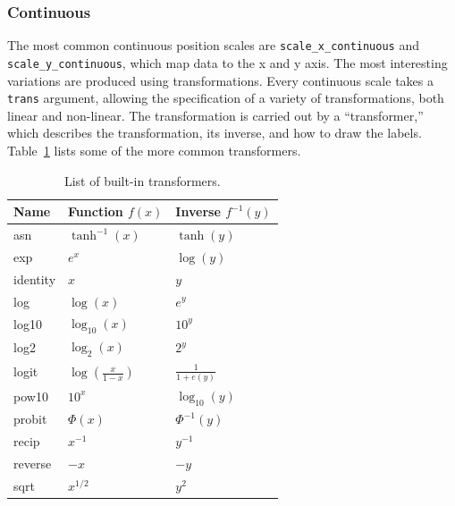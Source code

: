 \subsubsection{Continuous}
\label{sub:scale-continuous}

The most common continuous position scales are {\tt scale\_x\_continuous} and {\tt scale\_y\_continuous}, which map data to the x and y axis.  The most interesting variations are produced using transformations.  Every continuous scale takes a {\tt trans} argument, allowing the specification of a variety of transformations, both linear and non-linear.  The transformation is carried out by a ``transformer,'' which describes the transformation, its inverse, and how to draw the labels. Table~\ref{tbl:common-trans} lists some of the more common transformers.    

\begin{table}
  \centering
  \begin{tabular}{lll}
    \toprule
    Name & Function $f(x)$ & Inverse $f^{-1}(y)$ \\
    \midrule
    asn       & $\tanh^{-1}(x)$ & $\tanh(y)$ \\
    exp       & $e ^ x$         & $\log(y)$  \\
    identity  & $x$             & $y$        \\
    log       & $\log(x)$       & $e ^ y$    \\
    log10     & $\log_{10}(x)$  & $10 ^ y$   \\
    log2      & $\log_2(x)$     & $2 ^ y$    \\
    logit     & $\log(\frac{x}{1 - x})$ & $\frac{1}{1 + e(y)} $ \\
    pow10     & $10^x$          & $\log_{10}(y) $ \\
    probit    & $\Phi(x)$       & $\Phi^{-1}(y)$ \\
    recip     & $x^{-1}$        & $y^{-1}$ \\
    reverse   & $-x$            & $-y$     \\
    sqrt      & $x^{1/2}$       & $y ^ 2$  \\
    \bottomrule
  \end{tabular}
  \caption{List of built-in transformers.}
  \label{tbl:common-trans}
\end{table}

